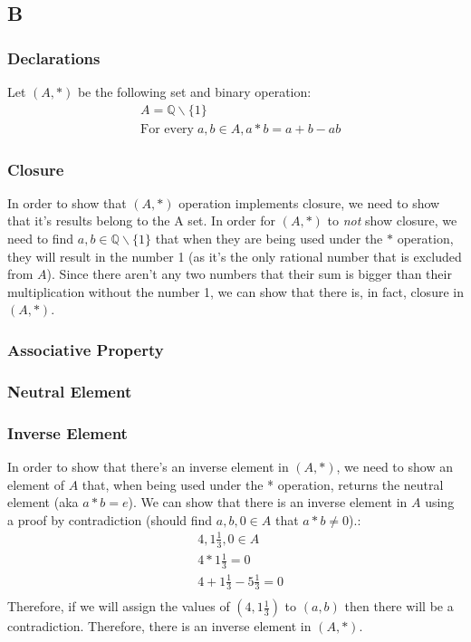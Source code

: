 \documentclass[12pt, oneside]{article}
\begin{document}
\subsection{B}
\setcounter{subsubsection}{-1}
\subsubsection{Declarations}
Let $(A, *)$ be the following set and binary operation:
\begin{eqnarray*}
& A = \mathbb{Q}\backslash\{1\}\\
& \text{For every}\;a, b \in A, a * b = a + b - ab
\end{eqnarray*}

\subsubsection{Closure}
In order to show that $(A, *)$ operation implements closure, we need to show that it’s results belong to the A set. In order for $(A, *)$ to \emph{not} show closure, we need to find $a, b \in \mathbb{Q}\backslash\{1\}$ that when they are being used under the $*$ operation, they will result in the number 1 (as it's the only rational number that is excluded from $A$). Since there aren't any two numbers that their sum is bigger than their multiplication without the number 1, we can show that there is, in fact, closure in $(A, *)$.

\subsubsection{Associative Property}

\subsubsection{Neutral Element}

\subsubsection{Inverse Element}
In order to show that there's an inverse element in $(A, *)$, we need to show an element of $A$ that, when being used under the * operation, returns the neutral element (aka $a * b = e$). We can show that there is an inverse element in $A$ using a proof by contradiction (should find $a, b, 0 \in A$ that $a * b \neq 0$).:
\begin{eqnarray*}
& 4, 1\frac{1}{3}, 0 \in A\\
& 4 * 1\frac{1}{3} = 0\\
& 4 + 1\frac{1}{3} - 5\frac{1}{3} = 0\\
\end{eqnarray*}
Therefore, if we will assign the values of $(4, 1\frac{1}{3})$ to $(a, b)$ then there will be a contradiction. Therefore, there is an inverse element in $(A, *)$.
\end{document}
